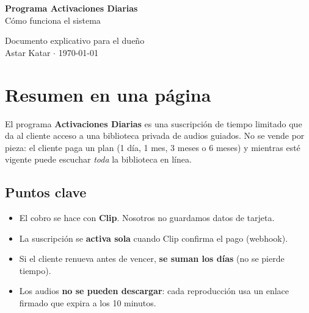 \documentclass[11pt,a4paper]{article}
\begin{document}
\begin{titlepage}
\centering
\vspace*{3cm}
{\Huge\bfseries\color{brandprimary} Programa Activaciones Diarias}\\[0.4cm]
{\Large Cómo funciona el sistema}\\[1.5cm]


\vfill
{\large Documento explicativo para el dueño}\\[0.4cm]
{\small Astar Katar $\cdot$ \today}
\end{titlepage}

\section{Resumen en una página}

El programa \textbf{Activaciones Diarias} es una suscripción de tiempo limitado
que da al cliente acceso a una biblioteca privada de audios guiados. No se vende
por pieza: el cliente paga un plan (1 día, 1 mes, 3 meses o 6 meses) y mientras
esté vigente puede escuchar \emph{toda} la biblioteca en línea.

\begin{center}
\end{center}

\subsection*{Puntos clave}
\begin{itemize}[leftmargin=*]
  \item El cobro se hace con \textbf{Clip}. Nosotros no guardamos datos de tarjeta.
  \item La suscripción se \textbf{activa sola} cuando Clip confirma el pago (webhook).
  \item Si el cliente renueva antes de vencer, \textbf{se suman los días} (no se pierde tiempo).
  \item Los audios \textbf{no se pueden descargar}: cada reproducción usa un enlace firmado que expira a los 10 minutos.
\end{itemize}
\end{document}
